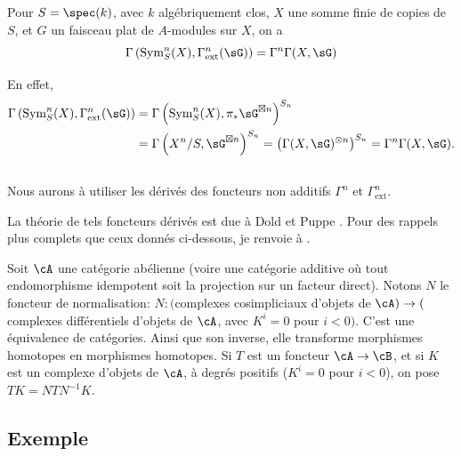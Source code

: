 \begin{lemma_}\label{III:1-3}
Pour $S=\spec(k)$, avec $k$ algébriquement clos, $X$ une somme finie de 
copies de $S$, et $G$ un faisceau plat de $A$-modules sur $X$, on a 
\[
  \Gamma\left(\operatorname{Sym}_S^n(X),\Gamma_\text{ext}^n(\sG)\right) = \Gamma^n \Gamma(X,\sG)
\]
\end{lemma_}

En effet, 
\begin{align*}
  \Gamma\left(\operatorname{Sym}_S^n(X),\Gamma_\text{ext}^n(\sG)\right) 
    &= \Gamma\left(\operatorname{Sym}_S^n(X),\pi_*\sG^{\boxtimes n}\right)^{S_n} \\
    &= \Gamma\left(X^n/S,\sG^{\boxtimes n}\right)^{S_n} 
    = \left(\Gamma(X,\sG)^{\otimes n}\right)^{S_n} 
    = \Gamma^n \Gamma(X,\sG) \text{.}
\end{align*}





\subsection{}\label{III:1-4}

Nous aurons à utiliser les dérivés des foncteurs non additifs $\Gamma^n$ 
et $\Gamma_\text{ext}^n$. 

La théorie de tels foncteurs dérivés est due à Dold et Puppe 
. Pour des rappels plus complets que ceux donnés ci-dessous, je 
renvoie à . 

Soit $\cA$ une catégorie abélienne (voire une catégorie additive où 
tout endomorphisme idempotent soit la projection sur un facteur direct). Notons 
$N$ le foncteur de normalisation: $N:($complexes cosimpliciaux d'objets de 
$\cA)\to($complexes différentiels d'objets de $\cA$, avec $K^i=0$ pour 
$i<0)$. C'est une équivalence de catégories. Ainsi que son inverse, elle 
transforme morphismes homotopes en morphismes homotopes. Si $T$ est un foncteur 
$\cA\to\cB$, et si $K$ est un complexe d'objets de $\cA$, à degrés 
positifs ($K^i=0$ pour $i<0$), on pose $T K=N T N^{-1} K$. 





\subsection{Exemple}\label{III:1-5}

